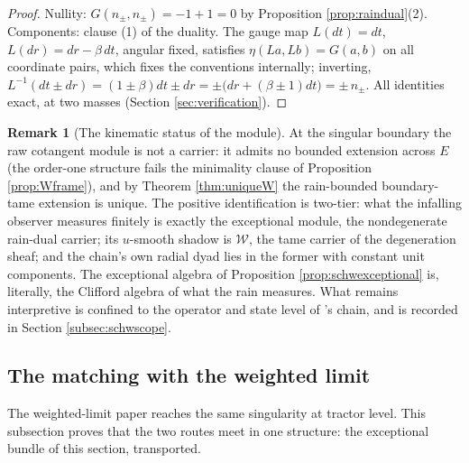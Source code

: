\documentclass[11pt]{article}
\theoremstyle{definition}
\newtheorem{remark}[theorem]{Remark}
\newcommand{\shW}{\mathcal{W}}
\newcommand{\dtPG}{dt}
\begin{document}
\begin{proof}
Nullity: $G(n_\pm, n_\pm) = -1 + 1 = 0$ by Proposition \ref{prop:raindual}(2). Components: clause (1) of the duality. The gauge map $L(\dtPG) = \dtPG$, $L(dr) = dr - \beta\,\dtPG$, angular fixed, satisfies $\eta(La, Lb) = G(a,b)$ on all coordinate pairs, which fixes the conventions internally; inverting, $L^{-1}(\dtPG \pm dr) = (1 \pm \beta)\dtPG \pm dr = \pm\bigl(dr + (\beta \pm 1)\dtPG\bigr) = \pm\,n_\pm$. All identities exact, at two masses (Section \ref{sec:verification}).
\end{proof}

\begin{remark}[The kinematic status of the module]\label{rem:rainanswer}
At the singular boundary the raw cotangent module is not a carrier: it admits no bounded extension across $E$ (the order-one structure fails the minimality clause of Proposition \ref{prop:Wframe}), and by Theorem \ref{thm:uniqueW} the rain-bounded boundary-tame extension is unique. The positive identification is two-tier: what the infalling observer measures finitely is exactly the exceptional module, the nondegenerate rain-dual carrier; its $u$-smooth shadow is $\shW$, the tame carrier of the degeneration sheaf; and the chain's own radial dyad lies in the former with constant unit components. The exceptional algebra of Proposition \ref{prop:schwexceptional} is, literally, the Clifford algebra of what the rain measures. What remains interpretive is confined to the operator and state level of \cite{ButlerT5}'s chain, and is recorded in Section \ref{subsec:schwscope}.
\end{remark}

\subsection{The matching with the weighted limit}\label{subsec:weld}

The weighted-limit paper reaches the same singularity at tractor level. This subsection proves that the two routes meet in one structure: the exceptional bundle of this section, transported.
\end{document}
